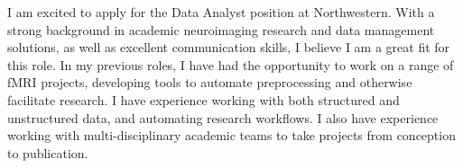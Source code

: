 I am excited to apply for the Data Analyst position at Northwestern. With a strong
background in academic neuroimaging research and data management solutions, as well as
excellent communication skills, I believe I am a great fit for this role. In my previous
roles, I have had the opportunity to work on a range of fMRI projects, developing tools
to automate preprocessing and otherwise facilitate research. I have experience working
with both structured and unstructured data, and automating research workflows. I also
have experience working with multi-disciplinary academic teams to take projects from
conception to publication.